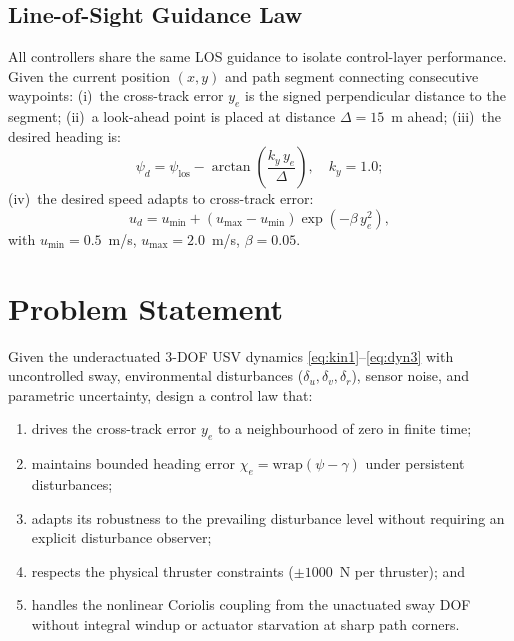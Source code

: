 \documentclass[review]{cas-dc}
\begin{document}
\subsection{Line-of-Sight Guidance Law}
\label{sec:los}

All controllers share the same LOS guidance to isolate control-layer performance. Given the current position $(x,y)$ and path segment connecting consecutive waypoints: (i)~the cross-track error $y_e$ is the signed perpendicular distance to the segment; (ii)~a look-ahead point is placed at distance $\Delta = 15$~m ahead; (iii)~the desired heading is:
\begin{equation}
\psi_d = \psi_{\mathrm{los}} - \arctan\!\left(\frac{k_y\, y_e}{\Delta}\right), \quad k_y = 1.0;
\label{eq:los}
\end{equation}
(iv)~the desired speed adapts to cross-track error:
\begin{equation}
u_d = u_{\min} + (u_{\max} - u_{\min})\exp(-\beta\, y_e^2),
\label{eq:speed_adapt}
\end{equation}
with $u_{\min} = 0.5$~m/s, $u_{\max} = 2.0$~m/s, $\beta = 0.05$.


\section{Problem Statement}
\label{sec:problem}

Given the underactuated 3-DOF USV dynamics \eqref{eq:kin1}--\eqref{eq:dyn3} with uncontrolled sway, environmental disturbances ($\delta_u, \delta_v, \delta_r$), sensor noise, and parametric uncertainty, design a control law that:
\begin{enumerate}
    \item[(i)] drives the cross-track error $y_e$ to a neighbourhood of zero in finite time;
    \item[(ii)] maintains bounded heading error $\chi_e = \mathrm{wrap}(\psi - \gamma)$ under persistent disturbances;
    \item[(iii)] adapts its robustness to the prevailing disturbance level without requiring an explicit disturbance observer;
    \item[(iv)] respects the physical thruster constraints ($\pm 1000$~N per thruster); and
    \item[(v)] handles the nonlinear Coriolis coupling from the unactuated sway DOF without integral windup or actuator starvation at sharp path corners.
\end{enumerate}
\end{document}
